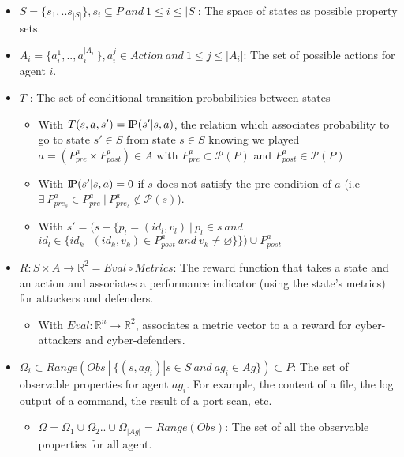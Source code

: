 \documentclass[conference]{IEEEtran}
\newcommand{\probP}{\text{I\kern-0.15em P}}
\begin{document}
\begin{itemize}
    \item $S = \{s_1, ..s_{|S|}\}, s_{i} \subseteq P \: and \: 1 \le i \le |S|$: The space of states as possible property sets.

    \item $A_{i} = \{a_{i}^{1},..,a_{i}^{|A_{i}|}\}, a_{i}^j \in Action \: and \: 1 \le j \le |A_i|$: The set of possible actions for agent $i$.

    \item $T$ : The set of conditional transition probabilities between states
          \begin{itemize}
              \item With $T(s,a,s') = \probP(s'|s,a)$, the relation which associates probability to go to state $s' \in S$ from state $s \in S$ knowing we played $a = (P^a_{pre} \times P^a_{post}) \in A$ with $P^a_{pre} \subset \mathcal{P}(P)$ and $P^a_{post} \in \mathcal{P}(P)$
              \item With $\probP(s'|s,a) = 0$ if $s$ does not satisfy the pre-condition of $a$ (i.e $\exists \: P_{pre_s}^{a} \in P_{pre}^{a} \: | \: P_{pre_s}^{a} \not\in \mathcal{P}(s)$).
              \item With $s' = (s - \{p_l=(id_l, v_l) \: | \: p_l \in s \: and$ $id_l \in \{id_k \: | \: (id_k, v_k) \in P^a_{post} \: and \: v_k \neq \varnothing\}\}) \cup P^a_{post}$
          \end{itemize}

    \item $R: S \times A \rightarrow \mathbb{R}^2 = Eval \circ Metrics$: The reward function that takes a state and an action and associates a performance indicator (using the state's metrics) for attackers and defenders.
          \begin{itemize}
              \item With $Eval: \mathbb{R}^{n} \rightarrow \mathbb{R}^2$, associates a metric vector to a a reward for cyber-attackers and cyber-defenders.
          \end{itemize}

    \item $\Omega_{i} \subset Range(Obs \: | \: \{ (s, ag_i) | s \in S \: and \: ag_i \in Ag \}) \subset P$: The set of observable properties for agent $ag_i$. For example, the content of a file, the log output of a command, the result of a port scan, etc.
          \begin{itemize}
              \item $\Omega = \Omega_1 \cup \Omega_2 .. \cup \Omega_{|Ag|} = Range(Obs)$: The set of all the observable properties for all agent.
          \end{itemize}


\end{itemize}
\end{document}
